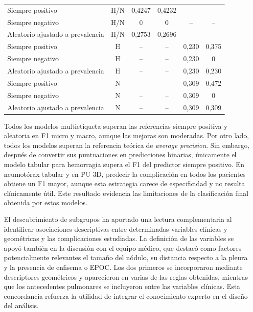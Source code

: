 \begin{table}[p]
\begin{tabularx}{\textwidth}{Xc c c c c}
Siempre positivo
& H/N
& 0,4247
& 0,4232
& --
& -- \\

Siempre negativo
& H/N
& 0
& 0
& --
& -- \\

Aleatorio ajustado a prevalencia
& H/N
& 0,2753
& 0,2696
& --
& -- \\

\addlinespace[2pt]

Siempre positivo
& H
& --
& --
& 0,230
& 0,375 \\

Siempre negativo
& H
& --
& --
& 0,230
& 0 \\

Aleatorio ajustado a prevalencia
& H
& --
& --
& 0,230
& 0,230 \\

\addlinespace[2pt]

Siempre positivo
& N
& --
& --
& 0,309
& 0,472 \\

Siempre negativo
& N
& --
& --
& 0,309
& 0 \\

Aleatorio ajustado a prevalencia
& N
& --
& --
& 0,309
& 0,309 \\

\bottomrule
\end{tabularx}
\end{table}

Todos los modelos multietiqueta superan las referencias siempre positiva y aleatoria en F1 micro y macro, aunque las mejoras son moderadas. Por otro lado, todos los modelos superan la referencia teórica de \textit{average precision}. Sin embargo, después de convertir sus puntuaciones en predicciones binarias, únicamente el modelo tabular para hemorragia supera el F1 del predictor siempre positivo. En neumotórax tabular y en PU 3D, predecir la complicación en todos los pacientes obtiene un F1 mayor, aunque esta estrategia carece de especificidad y no resulta clínicamente útil. Este resultado evidencia las limitaciones de la clasificación final obtenida por estos modelos.


El descubrimiento de subgrupos ha aportado una lectura complementaria al identificar asociaciones descriptivas entre determinadas variables clínicas y geométricas y las complicaciones estudiadas. La definición de las variables se apoyó también en la discusión con el equipo médico, que destacó como factores potencialmente relevantes el tamaño del nódulo, su distancia respecto a la pleura y la presencia de enfisema o EPOC. Los dos primeros se incorporaron mediante descriptores geométricos y aparecieron en varias de las reglas obtenidas, mientras que los antecedentes pulmonares se incluyeron entre las variables clínicas. Esta concordancia refuerza la utilidad de integrar el conocimiento experto en el diseño del análisis. 

